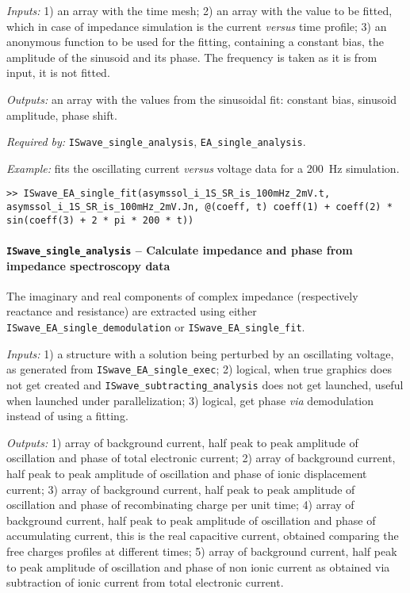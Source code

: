 	\textit{Inputs:} 1) an array with the time mesh;
	2) an array with the value to be fitted, which in case of impedance simulation is the current \textsl{versus} time profile;
	3) an anonymous function to be used for the fitting, containing
	a constant bias, the amplitude of the sinusoid and its phase. The
	frequency is taken as it is from input, it is not fitted.

	\textit{Outputs:} an array with the values from the sinusoidal fit: constant
	bias, sinusoid amplitude, phase shift.

	\textit{Required by:} \texttt{IS\-wave\_single\_analysis}, \texttt{EA\_single\_analysis}.

	\textit{Example:} fits the oscillating current \textsl{versus} voltage data for a \SI{200}{\Hz} simulation.
	\begin{lstlisting}[style=Matlab-editor]
>> ISwave_EA_single_fit(asymssol_i_1S_SR_is_100mHz_2mV.t, asymssol_i_1S_SR_is_100mHz_2mV.Jn, @(coeff, t) coeff(1) + coeff(2) * sin(coeff(3) + 2 * pi * 200 * t))
\end{lstlisting}



	\paragraph{\texttt{IS\-wave\_single\_analysis} -- Calculate impedance and phase from impedance spectroscopy data}
	The imaginary and real components of complex impedance (respectively reactance and resistance) are extracted using either \texttt{IS\-wave\_EA\_single\_demodulation} or \texttt{IS\-wave\_EA\_single\_fit}.

	\textit{Inputs:} 1) a structure with a solution being perturbed by an
	oscillating voltage, as generated from \texttt{IS\-wave\_EA\_single\_exec};
	2) logical, when true graphics does not get created and
	\texttt{IS\-wave\_subtracting\_analysis} does not get launched, useful when
	launched under parallelization;
	3) logical, get phase \textsl{via} demodulation instead of using a fitting.

	\textit{Outputs:} 1) array of background current, half peak to peak amplitude of
	oscillation and phase of total electronic current;
	2) array of background current, half peak to peak amplitude of
	oscillation and phase of ionic displacement current;
	3) array of background current, half peak to peak amplitude of
	oscillation and phase of recombinating charge per unit time;
	4) array of background current, half peak to peak amplitude of
	oscillation and phase of accumulating current, this is the real
	capacitive current, obtained comparing the free charges profiles at
	different times;
	5) array of background current, half peak to peak amplitude of
	oscillation and phase of non ionic current as obtained via
	subtraction of ionic current from total electronic current.

